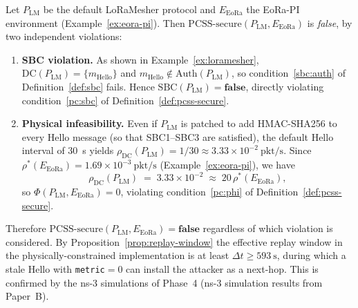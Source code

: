\begin{corollary}
\label{cor:loramesher-not-pcss}
Let $P_{\mathrm{LM}}$ be the default LoRaMesher protocol and
$E_{\mathrm{EoRa}}$ the EoRa-PI environment
(Example~\ref{ex:eora-pi}).  Then
$\mathrm{PCSS\text{-}secure}(P_{\mathrm{LM}}, E_{\mathrm{EoRa}})$ is
\emph{false}, by two independent violations:

\begin{enumerate}[label=(\roman*)]
  \item \textbf{SBC violation.}
        As shown in Example~\ref{ex:loramesher},
        $\mathrm{DC}(P_{\mathrm{LM}}) = \{m_{\mathrm{Hello}}\}$ and
        $m_{\mathrm{Hello}} \notin \mathrm{Auth}(P_{\mathrm{LM}})$, so
        condition~\ref{sbc:auth} of Definition~\ref{def:sbc} fails.
        Hence $\mathrm{SBC}(P_{\mathrm{LM}}) = \mathbf{false}$,
        directly violating condition~\ref{pc:sbc} of
        Definition~\ref{def:pcss-secure}.

  \item \textbf{Physical infeasibility.}
        Even if $P_{\mathrm{LM}}$ is patched to add HMAC-SHA256 to
        every Hello message (so that SBC1--SBC3 are satisfied),
        the default Hello interval of 30~s yields
        $\rho_{\mathrm{DC}}(P_{\mathrm{LM}}) = 1/30 \approx
        3.33 \times 10^{-2}\ \mathrm{pkt/s}$.
        Since $\rho^*(E_{\mathrm{EoRa}}) = 1.69 \times 10^{-3}\ \mathrm{pkt/s}$
        (Example~\ref{ex:eora-pi}), we have
        \[
          \rho_{\mathrm{DC}}(P_{\mathrm{LM}})
          \;=\; 3.33 \times 10^{-2}
          \;\approx\; 20\,\rho^*(E_{\mathrm{EoRa}}),
        \]
        so $\Phi(P_{\mathrm{LM}}, E_{\mathrm{EoRa}}) = 0$, violating
        condition~\ref{pc:phi} of Definition~\ref{def:pcss-secure}.
\end{enumerate}

Therefore $\mathrm{PCSS\text{-}secure}(P_{\mathrm{LM}}, E_{\mathrm{EoRa}})
= \mathbf{false}$ regardless of which violation is considered.  By
Proposition~\ref{prop:replay-window} the effective replay window in the
physically-constrained implementation is at least $\Delta t \ge 593\ \mathrm{s}$,
during which a stale Hello with \texttt{metric}$=0$ can install the
attacker as a next-hop.  This is confirmed by the ns-3 simulations of
Phase~4 (ns-3 simulation results from Paper~B).
\end{corollary}

